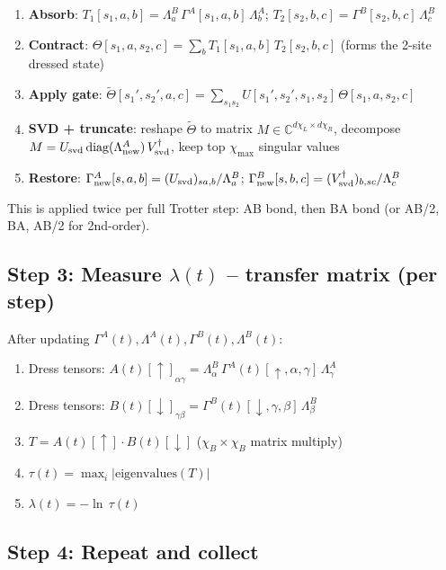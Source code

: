 \documentclass[11pt, a4paper]{article}
\begin{document}
\begin{enumerate}
  \item \textbf{Absorb}: $T_1[s_1,a,b] = \Lambda^B_a\,\Gamma^A[s_1,a,b]\,\Lambda^A_b$; \quad $T_2[s_2,b,c] = \Gamma^B[s_2,b,c]\,\Lambda^B_c$
  \item \textbf{Contract}: $\Theta[s_1,a,s_2,c] = \sum_b T_1[s_1,a,b]\,T_2[s_2,b,c]$ \quad (forms the 2-site dressed state)
  \item \textbf{Apply gate}: $\tilde\Theta[s_1',s_2',a,c] = \sum_{s_1 s_2} U[s_1',s_2',s_1,s_2]\,\Theta[s_1,a,s_2,c]$
  \item \textbf{SVD + truncate}: reshape $\tilde\Theta$ to matrix $M \in \mathbb{C}^{d\chi_L \times d\chi_R}$, decompose $M = U_{\rm svd}\,\text{diag}(\Lambda^A_{\rm new})\,V^\dagger_{\rm svd}$, keep top $\chi_{\max}$ singular values
  \item \textbf{Restore}: $\Gamma^A_{\rm new}[s,a,b] = (U_{\rm svd})_{sa,b} / \Lambda^B_a$; \quad $\Gamma^B_{\rm new}[s,b,c] = (V^\dagger_{\rm svd})_{b,sc} / \Lambda^B_c$
\end{enumerate}

This is applied twice per full Trotter step: AB bond, then BA bond (or AB/2, BA, AB/2 for 2nd-order).

\subsection{Step 3: Measure $\lambda(t)$ -- transfer matrix (per step)}

After updating $\Gamma^A(t), \Lambda^A(t), \Gamma^B(t), \Lambda^B(t)$:
\begin{enumerate}
  \item Dress tensors: $A(t)[\uparrow]_{\alpha\gamma} = \Lambda^B_\alpha\,\Gamma^A(t)[\uparrow,\alpha,\gamma]\,\Lambda^A_\gamma$
  \item Dress tensors: $B(t)[\downarrow]_{\gamma\beta} = \Gamma^B(t)[\downarrow,\gamma,\beta]\,\Lambda^B_\beta$
  \item $T = A(t)[\uparrow] \cdot B(t)[\downarrow]$ \quad ($\chi_B \times \chi_B$ matrix multiply)
  \item $\tau(t) = \max_i |\text{eigenvalues}(T)|$
  \item $\lambda(t) = -\ln\,\tau(t)$
\end{enumerate}

\subsection{Step 4: Repeat and collect}
\end{document}
